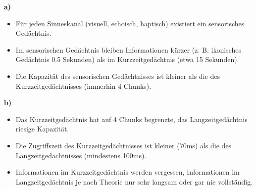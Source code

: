 
\textbf{a)}
\begin{itemize}
  \item Für jeden Sinneskanal (visuell, echoisch, haptisch) existiert ein sensorisches Gedächtnis.
  \item Im sensorischen Gedächtnis bleiben Informationen kürzer (z. B. ikonisches Gedächtnis 0.5 Sekunden) als im Kurzzeitgedächtnis (etwa 15 Sekunden).
  \item Die Kapazität des sensorischen Gedächtnisses ist kleiner als die des Kurzzeitgedächtnisses (immerhin 4 Chunks).
\end{itemize}
\textbf{b)}
\begin{itemize}
  \item Das Kurzzeitgedächtnis hat auf 4 Chunks begrenzte, das Langzeitgedächtnis riesige Kapazität.
  \item Die Zugriffszeit des Kurzzeitgedächtnisses ist kleiner (70ms) als die des Langzeitgedächtnisses (mindestens 100ms).
  \item Informationen im Kurzzeitgedächtnis werden vergessen, Informationen im Langzeitgedächtnis je nach Theorie nur sehr langsam oder gar nie vollständig.
\end{itemize}